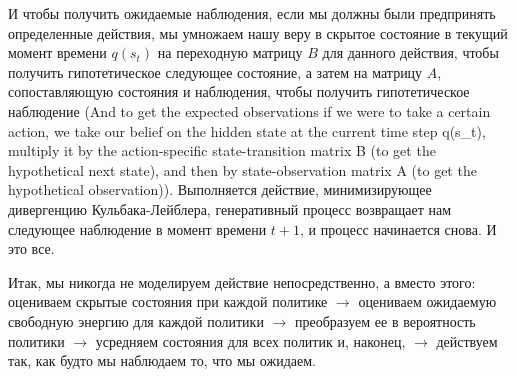 \documentclass[twoside,leqno, 11pt]{article}
\begin{document}
	И чтобы получить ожидаемые наблюдения, если мы должны были предпринять определенные действия, мы умножаем нашу веру в скрытое состояние в текущий момент времени $q(s_t)$ на переходную матрицу $B$ для данного действия, чтобы получить гипотетическое следующее состояние, а затем на матрицу $A$, сопоставляющую состояния и наблюдения, чтобы получить гипотетическое наблюдение (And to get the expected observations if we were to take a certain action, we take our belief on the hidden state at the current time step q(s\_t), multiply it by the action-specific state-transition matrix B (to get the hypothetical next state), and then by state-observation matrix A (to get the hypothetical observation)). Выполняется действие, минимизирующее дивергенцию Кульбака-Лейблера, генеративный процесс возвращает нам следующее наблюдение в момент времени $t+1$, и процесс начинается снова. И это все.
	
	\begin{figure}[h]
	\end{figure}
	
	
	Итак, мы никогда не моделируем действие непосредственно, а вместо этого: оцениваем скрытые состояния при каждой политике $\rightarrow$ оцениваем ожидаемую свободную энергию для каждой политики $\rightarrow$ преобразуем ее в вероятность политики $\rightarrow$ усредняем состояния для всех политик и, наконец, $\rightarrow$ действуем так, как будто мы наблюдаем то, что мы ожидаем.
	
\end{document}
